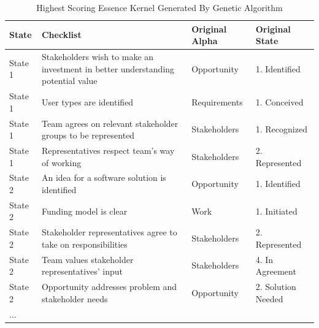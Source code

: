 \documentclass[preprint,12pt,3p]{elsarticle}
\begin{document}
\begin{table}[h]
\caption{Highest Scoring Essence Kernel Generated By Genetic Algorithm}
\label{BestResults}
\centering
\begin{tabular}{|p{0.50in}|p{2.80in}|p{1.00in}|p{1.40in}|}
\hline
State & Checklist & Original \mbox{Alpha} & Original State \\ \hline
State 1 & Stakeholders wish to make an investment in better understanding potential value & Opportunity & 1. Identified \\ \hline
State 1 & User types are identified & Requirements & 1. Conceived \\ \hline
State 1 & Team agrees on relevant stakeholder groups to be represented & Stakeholders & 1. Recognized \\ \hline
State 1 & Representatives respect team's way of working  & Stakeholders & 2. Represented \\ \hline
State 2 & An idea for a software solution is identified & Opportunity & 1. Identified \\ \hline
State 2 & Funding model is clear & Work & 1. Initiated \\ \hline
State 2 & Stakeholder representatives agree to take on responsibilities & Stakeholders & 2. Represented \\  \hline
State 2 & Team values stakeholder representatives' input & Stakeholders & 4. In Agreement \\ \hline
State 2 & Opportunity addresses problem and stakeholder needs & Opportunity & 2. Solution Needed \\ \hline
... &  & \\ \hline
\end{tabular}
\end{table}




\end{document}
